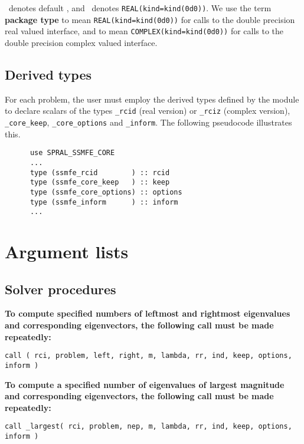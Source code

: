 \Integer\ denotes default \Integer, and \REALDP\ denotes
\texttt{REAL(kind=kind(0d0))}. We use the term {\bf package type} to mean
\texttt{REAL(kind=kind(0d0))} for calls to the double precision real valued
interface, and to mean \texttt{COMPLEX(kind=kind(0d0))} for calls to the double
precision complex valued interface.

\subsection{Derived types}
\label{sec:derived}

For each problem, the user must employ the derived types defined by the
module to declare scalars of the types 
{\tt \solver\_rcid} (real version) or 
{\tt \solver\_rciz} (complex version), 
{\tt \solver\_core\_keep},
{\tt \solver\_core\_options} and 
{\tt \solver\_inform}.
The following pseudocode illustrates this.
\begin{verbatim}
      use SPRAL_SSMFE_CORE
      ...
      type (ssmfe_rcid        ) :: rcid
      type (ssmfe_core_keep   ) :: keep
      type (ssmfe_core_options) :: options
      type (ssmfe_inform      ) :: inform
      ...
\end{verbatim}

\section{Argument lists}

\subsection{Solver procedures}

{\bf
To compute specified numbers %
of leftmost and rightmost eigenvalues 
and corresponding eigenvectors,
the following call must be made repeatedly:
}

\medskip
{\tt call
\solver( rci, problem, left, right, m, lambda, rr, ind, keep, options, inform )
}

\medskip
\noindent
{\bf
To compute a specified number %
of eigenvalues of largest magnitude 
and corresponding eigenvectors,
the following call must be made repeatedly:
}

\medskip
{\tt call
\solver\_largest( rci, problem, nep, m, lambda, rr, ind, keep, options, inform )
}

